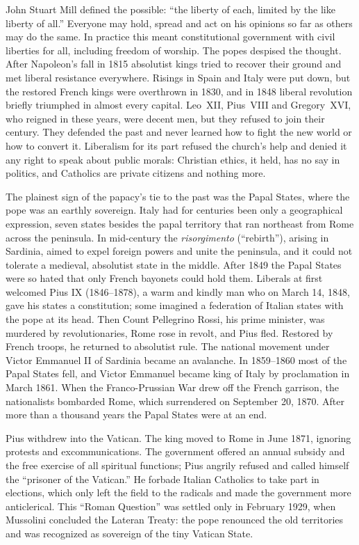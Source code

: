 John Stuart Mill defined the possible: ``the liberty of each, limited by the like liberty of all.''
Everyone may hold, spread and act on his opinions so far as others may do the same. In practice this
meant constitutional government with civil liberties for all, including freedom of worship. The popes
despised the thought. After Napoleon's fall in 1815 absolutist kings tried to recover their ground
and met liberal resistance everywhere. Risings in Spain and Italy were put down, but the restored
French kings were overthrown in 1830, and in 1848 liberal revolution briefly triumphed in almost
every capital. Leo~XII, Pius~VIII and Gregory~XVI, who reigned in these years, were decent men, but they refused to join their century. They defended the past and never learned how to fight the new
world or how to convert it. Liberalism for its part refused the church's help and denied it any right
to speak about public morals: Christian ethics, it held, has no say in politics, and Catholics are private citizens and nothing more.

The plainest sign of the papacy's tie to the past was the Papal States, where the pope was an earthly
sovereign. Italy had for centuries been only a geographical expression, seven states besides the
papal territory that ran northeast from Rome across the peninsula. In mid-century the
\emph{risorgimento} (``rebirth''), arising in Sardinia, aimed to expel foreign powers and unite the
peninsula, and it could not tolerate a medieval, absolutist state in the middle. After 1849 the Papal
States were so hated that only French bayonets could hold them. Liberals at first welcomed Pius IX
(1846--1878), a warm and kindly man who on March 14, 1848, gave his states a constitution; some imagined a federation of Italian states with the pope at its head. Then Count Pellegrino Rossi, his prime minister, was murdered by revolutionaries, Rome rose in revolt, and Pius fled. Restored by French
troops, he returned to absolutist rule. The national movement under Victor Emmanuel II of Sardinia
became an avalanche. In 1859--1860 most of the Papal States fell, and Victor Emmanuel became king of Italy by proclamation in March 1861. When the Franco-Prussian War drew off the French garrison, the
nationalists bombarded Rome, which surrendered on September 20, 1870. After more than a thousand
years the Papal States were at an end.

Pius withdrew into the Vatican. The king moved to Rome in June 1871, ignoring protests and
excommunications. The government offered an annual subsidy and the free exercise of all spiritual
functions; Pius angrily refused and called himself the ``prisoner of the Vatican.'' He forbade
Italian Catholics to take part in elections, which only left the field to the radicals and made the
government more anticlerical. This ``Roman Question'' was settled only in February 1929, when
Mussolini concluded the Lateran Treaty: the pope renounced the old territories and was recognized as sovereign of the tiny Vatican State.

